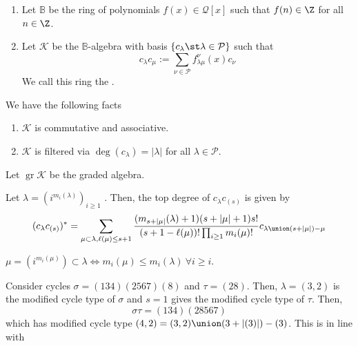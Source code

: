 \documentclass[11pt,leqno,oneside]{amsbook}
\newcommand{\partitions}{\mathcal{P}} %
\newcommand{\B}{\mathbb{B}}
\newcommand{\K}{\mathcal{K}}
\DeclareMathOperator{\gr}{gr}
\numberwithin{thm}{section}
\begin{document}
\begin{defn}
  \begin{enumerate}
  \item  Let \(\B\) be the ring of polynomials \(f(x) \in \mathcal{Q}[x]\) such that
  \(f(n) \in \Z\) for all \(n \in \Z\).
  \item Let \(\K\) be the \(\B\)-algebra with basis \(\{c_\lambda \st
    \lambda \in \partitions\}\) such that \[
      c_\lambda c_\mu := \sum_{\nu \in \partitions} f_{\lambda
        \mu}^\nu(x) c_\nu
    \]
    We call this ring the .
  \end{enumerate}
\end{defn}
\begin{prop}
  We have the following facts
  \begin{enumerate}
  \item \(\K\) is commutative and associative.
  \item \(\K\) is filtered via \(\deg(c_\lambda) = |\lambda|\) for all
    \(\lambda \in \partitions\).
  \end{enumerate}
\end{prop}
\begin{defn}
  Let \(\gr \K\) be the graded algebra.
\end{defn}
\begin{prop}
  Let \(\lambda = (i^{m_i(\lambda)})_{i \geq 1}\) . Then, the top
  degree of \(c_\lambda c_{(s)}\) is given by \[
    (c_\lambda c_{(s)})^* = \sum_{\mu \subset \lambda, \ell(\mu) \leq
      s+1} \frac{(m_{s+|\mu|}(\lambda)+1)(s+|\mu|+1)s!}{(s+1-\ell(\mu))!
    \prod_{i \geq 1} m_i(\mu)!} c_{\lambda \union(s+|\mu|) - \mu}
  \]
\end{prop}
\begin{rmk}
  \(\mu = (i^{m_i(\mu)}) \subset \lambda \iff m_i(\mu) \leq
  m_i(\lambda) \ \forall i \geq i\).
\end{rmk}
\begin{example}
  Consider cycles \(\sigma = (134)(2567)(8)\) and \(\tau =
  (28)\). Then, \(\lambda = (3,2)\) is the modified cycle type of
  \(\sigma\) and \(s=1\) gives the modified cycle type of
  \(\tau\). Then, \[
    \sigma \tau = (134)(28567)
  \]
  which has modified cycle type \((4,2) = (3,2) \union (3+|(3)|) -
  (3)\). This is in line with 
\end{example}
\end{document}

